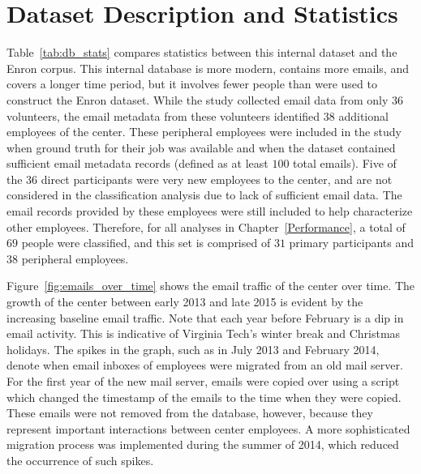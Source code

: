 \documentclass[12pt]{report}
\begin{document}
\section{Dataset Description and Statistics}
Table~\ref{tab:db_stats} compares statistics between this internal dataset and the Enron corpus.
This internal database is more modern, contains more emails, and covers a longer time period, but it involves fewer people than were used to construct the Enron dataset.
While the study collected email data from only $36$ volunteers, the email metadata from these volunteers identified $38$ additional employees of the center.
These peripheral employees were included in the study when ground truth for their job was available and when the dataset contained sufficient email metadata records (defined as at least $100$ total emails).
Five of the $36$ direct participants were very new employees to the center, and are not considered in the classification analysis due to lack of sufficient email data.
The email records provided by these employees were still included to help characterize other employees.
Therefore, for all analyses in Chapter~\ref{Performance}, a total of $69$ people were classified, and this set is comprised of $31$ primary participants and $38$ peripheral employees.

\begin{table}[t]
\centering
\caption{A comparison between the internal dataset and the Enron email corpus.}
\label{tab:db_stats}
\end{table}

Figure~\ref{fig:emails_over_time} shows the email traffic of the center over time.
The growth of the center between early 2013 and late 2015 is evident by the increasing baseline email traffic.
Note that each year before February is a dip in email activity.
This is indicative of Virginia Tech's winter break and Christmas holidays.
The spikes in the graph, such as in July 2013 and February 2014, denote when email inboxes of employees were migrated from an old mail server.
For the first year of the new mail server, emails were copied over using a script which changed the timestamp of the emails to the time when they were copied.
These emails were not removed from the database, however, because they represent important interactions between center employees.
A more sophisticated migration process was implemented during the summer of 2014, which reduced the occurrence of such spikes.
\end{document}
